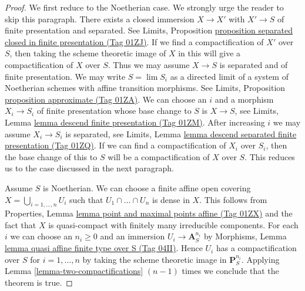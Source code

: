 \documentclass{amsart}
\theoremstyle{plain}
\theoremstyle{definition}
\theoremstyle{remark}
\numberwithin{equation}{subsection}
\def\lim{\mathop{\mathrm{lim}}\nolimits}
\begin{document}
\begin{proof}
We first reduce to the Noetherian case. We strongly urge the reader
to skip this paragraph. There exists a closed immersion
$X \to X'$ with $X' \to S$ of finite presentation and separated.
See Limits, Proposition
\href{https://stacks.math.columbia.edu/tag/01ZJ}{proposition separated closed in finite presentation (Tag 01ZJ)}.
If we find a compactification of $X'$ over $S$, then
taking the scheme theoretic image of $X$ in this will give
a compactification of $X$ over $S$. Thus we may assume
$X \to S$ is separated and of finite presentation.
We may write $S = \lim S_i$ as a directed
limit of a system of Noetherian schemes with affine transition morphisms.
See Limits, Proposition \href{https://stacks.math.columbia.edu/tag/01ZA}{proposition approximate (Tag 01ZA)}.
We can choose an $i$ and a morphism $X_i \to S_i$ of finite
presentation whose base change to $S$ is $X \to S$, see
Limits, Lemma \href{https://stacks.math.columbia.edu/tag/01ZM}{lemma descend finite presentation (Tag 01ZM)}.
After increasing $i$ we may assume $X_i \to S_i$ is separated, see
Limits, Lemma \href{https://stacks.math.columbia.edu/tag/01ZQ}{lemma descend separated finite presentation (Tag 01ZQ)}.
If we can find a compactification of $X_i$ over $S_i$, then the
base change of this to $S$ will be a compactification of $X$ over $S$.
This reduces us to the case discussed in the next paragraph.

\medskip\noindent
Assume $S$ is Noetherian. We can choose a finite affine open covering
$X = \bigcup_{i = 1, \ldots, n} U_i$ such that $U_1 \cap \ldots \cap U_n$
is dense in $X$. This follows from
Properties, Lemma \href{https://stacks.math.columbia.edu/tag/01ZX}{lemma point and maximal points affine (Tag 01ZX)}
and the fact that $X$ is quasi-compact with finitely many
irreducible components. For each $i$ we can choose an $n_i \geq 0$ and an
immersion $U_i \to \mathbf{A}^{n_i}_S$ by
Morphisms, Lemma \href{https://stacks.math.columbia.edu/tag/04II}{lemma quasi affine finite type over S (Tag 04II)}.
Hence $U_i$ has a compactification over $S$ for $i = 1, \ldots, n$
by taking the scheme theoretic image in $\mathbf{P}^{n_i}_S$.
Applying Lemma \ref{lemma-two-compactifications}
$(n - 1)$ times we conclude that the theorem is true.
\end{proof}
\end{document}
